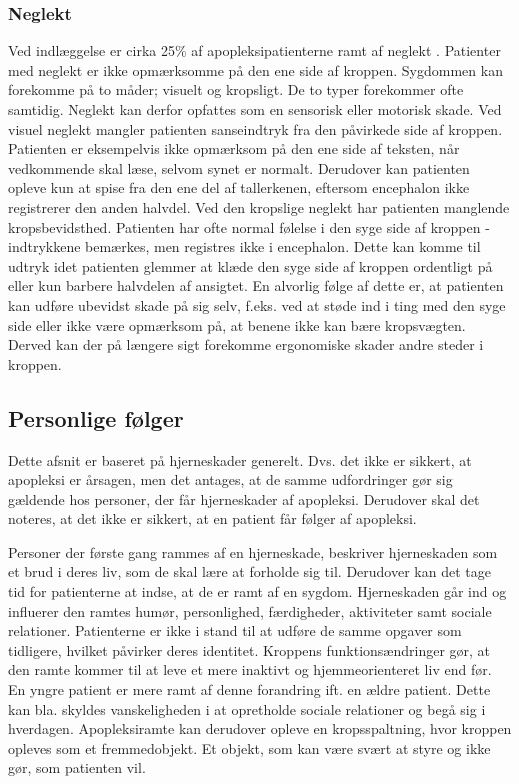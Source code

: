 \subsubsection{Neglekt}
Ved indlæggelse er cirka 25\% af apopleksipatienterne ramt af neglekt \cite{Sundhedsstyrelsen2009}. Patienter med neglekt er ikke opmærksomme på den ene side af kroppen. Sygdommen kan forekomme på to måder; visuelt og kropsligt. De to typer forekommer ofte samtidig. Neglekt kan derfor opfattes som en sensorisk eller motorisk skade. Ved visuel neglekt mangler patienten sanseindtryk fra den påvirkede side af kroppen. Patienten er eksempelvis ikke opmærksom på den ene side af teksten, når vedkommende skal læse, selvom synet er normalt. Derudover kan patienten opleve kun at spise fra den ene del af tallerkenen, eftersom encephalon ikke registrerer den anden halvdel. Ved den kropslige neglekt har patienten manglende kropsbevidsthed. Patienten har ofte normal følelse i den syge side af kroppen - indtrykkene bemærkes, men registres ikke i encephalon. Dette kan komme til udtryk idet patienten glemmer at klæde den syge side af kroppen ordentligt på eller kun barbere halvdelen af ansigtet. En alvorlig følge af dette er, at patienten kan udføre ubevidst skade på sig selv, f.eks. ved at støde ind i ting med den syge side eller ikke være opmærksom på, at benene ikke kan bære kropsvægten. Derved kan der på længere sigt forekomme ergonomiske skader andre steder i kroppen. \cite{Sundhed.dk}

\subsection{Personlige følger}
Dette afsnit er baseret på hjerneskader generelt. Dvs. det ikke er sikkert, at apopleksi er årsagen, men det antages, at de samme udfordringer gør sig gældende hos personer, der får hjerneskader af apopleksi. Derudover skal det noteres, at det ikke er sikkert, at en patient får følger af apopleksi.

Personer der første gang rammes af en hjerneskade, beskriver hjerneskaden som et brud i deres liv, som de skal lære at forholde sig til. Derudover kan det tage tid for patienterne at indse, at de er ramt af en sygdom. Hjerneskaden går ind og influerer den ramtes humør, personlighed, færdigheder, aktiviteter samt sociale relationer. Patienterne er ikke i stand til at udføre de samme opgaver som tidligere, hvilket påvirker deres identitet. Kroppens funktionsændringer gør, at den ramte kommer til at leve et mere inaktivt og hjemmeorienteret liv end før. En yngre patient er mere ramt af denne forandring ift. en ældre patient. Dette kan bla. skyldes vanskeligheden i at opretholde sociale relationer og begå sig i hverdagen. Apopleksiramte kan derudover opleve en kropsspaltning, hvor kroppen opleves som et fremmedobjekt. Et objekt, som kan være svært at styre og ikke gør, som patienten vil. \cite{Sundhedsstyrelsen2010}

